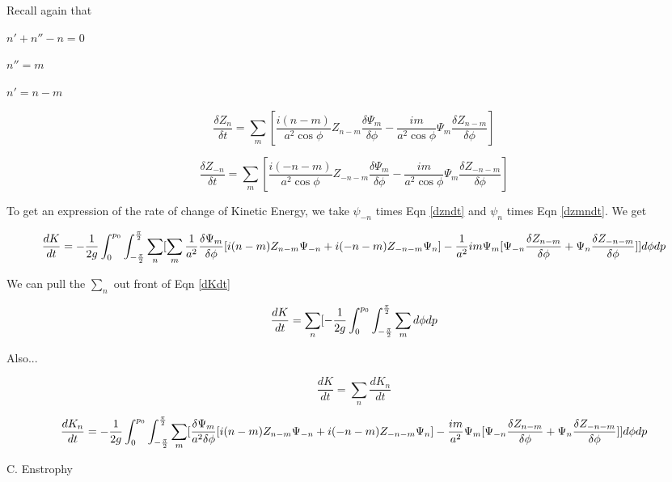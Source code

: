 \documentclass{article}
\begin{document}
Recall again that

$n'+n''-n = 0$

$n'' = m$

$n'= n-m$

\begin{equation}
\frac{\delta Z_n}{\delta t} = \sum_m [ \frac{i(n-m)}{a^2 \cos{\phi}} Z_{n-m} \frac{\delta \Psi_m}{\delta \phi} - \frac{im}{a^2 \cos{\phi}} \Psi_m \frac{\delta Z_{n-m}}{\delta \phi} ]
\label{dzndt}
\end{equation}

\begin{equation}
\frac{\delta Z_{-n}}{\delta t} = \sum_m [ \frac{i(-n-m)}{a^2 \cos{\phi}} Z_{-n-m} \frac{\delta \Psi_m}{\delta \phi} - \frac{im}{a^2 \cos{\phi}} \Psi_m \frac{\delta Z_{-n-m}}{\delta \phi} ]
\label{dzmndt}
\end{equation}

To get an expression of the rate of change of Kinetic Energy, we take $\psi_{-n}$ times Eqn \ref{dzndt} and $\psi_n$ times Eqn \ref{dzmndt}.  We get

\begin{equation}
\frac{dK}{dt} = - \frac{1}{2g} \int_{0}^{p_0} \int_{-\frac{\pi}{2}}^{\frac{\pi}{2}} \sum_n [ \sum_m \frac{1}{a^2} \frac{\delta \Psi_m}{\delta \phi} [ i(n-m) Z_{n-m} \Psi_{-n} + i(-n-m) Z_{-n-m} \Psi_n ] - \frac{1}{a^2} im \Psi_m [ \Psi_{-n} \frac{\delta Z_{n-m}}{\delta \phi} + \Psi_n \frac{\delta Z_{-n-m}}{\delta \phi}] ] d\phi dp
\label{dKdt}
\end{equation}

We can pull the $\sum_n$ out front of Eqn \ref{dKdt}

\begin{equation}
\frac{dK}{dt} = \sum_n [ - \frac{1}{2g} \int_{0}^{p_0} \int_{-\frac{\pi}{2}}^{\frac{\pi}{2}} \sum_m d\phi dp
\end{equation}

Also...

\begin{equation}
\frac{dK}{dt} = \sum_n \frac{dK_n}{dt}
\end{equation}

\begin{equation}
\frac{dK_n}{dt} = - \frac{1}{2g} \int_{0}^{p_0} \int_{-\frac{\pi}{2}}^{\frac{\pi}{2}} \sum_m [ \frac{\delta \Psi_m}{a^2 \delta \phi} [i(n-m) Z_{n-m} \Psi_{-n} + i(-n-m) Z_{-n-m} \Psi_{n} ] - \frac{im}{a^2} \Psi_m [ \Psi_{-n} \frac{\delta Z_{n-m}}{\delta \phi} + \Psi_n \frac{\delta Z_{-n-m}}{\delta \phi} ] ] d\phi dp
\end{equation}

C. Enstrophy
\end{document}

